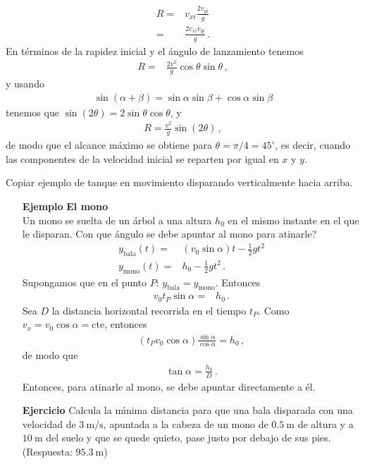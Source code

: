 \begin{enumerate}
\begin{align}
  R=&v_{xi}\frac{2v_{yi}}{g}\nonumber\\
  =&\frac{2v_{xi}v_{yi}}{g}\,.
\end{align}
En términos de la rapidez inicial y el ángulo de lanzamiento tenemos
\begin{align}
  R=&\frac{2v^2}{g}\cos\theta\sin\theta\,,
\end{align}
y usando
\begin{align}
  \sin(\alpha+\beta)=\sin\alpha\sin\beta+\cos\alpha\sin\beta
\end{align}
tenemos que $\sin(2\theta)=2\sin\theta\cos\theta$, y
\begin{align}
  R=\frac{v^2}{g}\sin(2\theta)\,,
\end{align}
de modo que el alcance máximo se obtiene para $\theta=\pi/4=45^\circ$,
es decir, cuando las componentes de la velocidad inicial se reparten
por igual en $x$ y $y$.
  \end{enumerate}



\begin{inprogress}
  Copiar ejemplo de tanque en movimiento disparando verticalmente hacia arriba.
\end{inprogress}

\begin{itemize}
\item[\textbf{Ejemplo}] \textbf{El mono}\\
Un mono se suelta de un \'arbol a una altura $h_0$ en el mismo instante en el que le disparan. \textquestiondown Con que \'angulo se debe apuntar al mono para atinarle?
  \begin{align}
    y_{\text{bala}}(t)=&(v_0\sin\alpha)t-\tfrac{1}{2}g t^2\nonumber\\
    y_{\text{mono}}(t)=&h_0-\tfrac{1}{2}g t^2\,.
  \end{align}
Supongamos que en el punto $P$: $y_{\text{bala}}=y_{\text{mono}}$. Entonces
\begin{align}
  v_0 t_P\sin\alpha=&h_0\,.
\end{align}
Sea $D$ la distancia horizontal recorrida en el tiempo $t_P$. Como $v_x=v_0\cos\alpha=\text{cte}$, entonces
\begin{align}
  (t_Pv_0\cos\alpha)\frac{\sin\alpha}{\cos\alpha}=h_0\,,
\end{align}
de modo que
\begin{align}
  \tan\alpha=\frac{h_0}{D}\,.
\end{align}
Entonces, para atinarle al mono, se debe apuntar directamente a \'el.

\item[\textbf{Ejercicio}]Calcula la m\'\i nima distancia para que una bala disparada con una velocidad de $3\ \text{m/s}$, apuntada a la cabeza de un mono de $0.5\ $m de altura y a $10\ $m del suelo y que se quede quieto, pase justo por debajo de sus pies. (Respuesta: $95.3\ $m)
\end{itemize}





